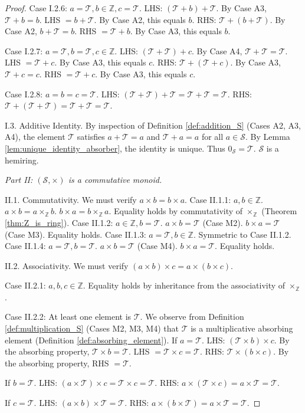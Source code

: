 \documentclass[11pt, a4paper]{article}
\theoremstyle{plain}
\theoremstyle{definition}
\numberwithin{equation}{section}
\newcommand{\Z}{\mathbb{Z}}
\newcommand{\Tobj}{\mathcal{T}} %
\newcommand{\SemiringS}{\mathcal{S}}
\begin{document}
\begin{proof}
Case I.2.6: $a=\Tobj, b \in \Z, c=\Tobj$.
LHS: $(\Tobj+b)+\Tobj$. By Case A3, $\Tobj+b=b$. LHS $= b+\Tobj$. By Case A2, this equals $b$.
RHS: $\Tobj+(b+\Tobj)$. By Case A2, $b+\Tobj=b$. RHS $= \Tobj+b$. By Case A3, this equals $b$.

Case I.2.7: $a=\Tobj, b=\Tobj, c \in \Z$.
LHS: $(\Tobj+\Tobj)+c$. By Case A4, $\Tobj+\Tobj=\Tobj$. LHS $= \Tobj+c$. By Case A3, this equals $c$.
RHS: $\Tobj+(\Tobj+c)$. By Case A3, $\Tobj+c=c$. RHS $= \Tobj+c$. By Case A3, this equals $c$.

Case I.2.8: $a=b=c=\Tobj$.
LHS: $(\Tobj+\Tobj)+\Tobj = \Tobj+\Tobj = \Tobj$. RHS: $\Tobj+(\Tobj+\Tobj) = \Tobj+\Tobj = \Tobj$.

I.3. Additive Identity. By inspection of Definition \ref{def:addition_S} (Cases A2, A3, A4), the element $\Tobj$ satisfies $a+\Tobj=a$ and $\Tobj+a=a$ for all $a \in \SemiringS$. By Lemma \ref{lem:unique_identity_absorber}, the identity is unique. Thus $0_{\SemiringS}=\Tobj$. $\SemiringS$ is a hemiring.

\emph{Part II: $(\SemiringS, \times)$ is a commutative monoid.}

II.1. Commutativity. We must verify $a\times b = b\times a$.
Case II.1.1: $a, b \in \Z$. $a\times b = a\times_{\Z} b$. $b\times a = b\times_{\Z} a$. Equality holds by commutativity of $\times_{\Z}$ (Theorem \ref{thm:Z_is_ring}).
Case II.1.2: $a \in \Z, b=\Tobj$. $a\times b = \Tobj$ (Case M2). $b\times a = \Tobj$ (Case M3). Equality holds.
Case II.1.3: $a=\Tobj, b \in \Z$. Symmetric to Case II.1.2.
Case II.1.4: $a=\Tobj, b=\Tobj$. $a\times b = \Tobj$ (Case M4). $b\times a = \Tobj$. Equality holds.

II.2. Associativity. We must verify $(a\times b)\times c = a\times(b\times c)$.

Case II.2.1: $a, b, c \in \Z$. Equality holds by inheritance from the associativity of $\times_{\Z}$.

Case II.2.2: At least one element is $\Tobj$. We observe from Definition \ref{def:multiplication_S} (Cases M2, M3, M4) that $\Tobj$ is a multiplicative absorbing element (Definition \ref{def:absorbing_element}).
If $a=\Tobj$. LHS: $(\Tobj\times b)\times c$. By the absorbing property, $\Tobj\times b = \Tobj$. LHS $=\Tobj\times c = \Tobj$.
RHS: $\Tobj\times(b\times c)$. By the absorbing property, RHS $=\Tobj$.

If $b=\Tobj$. LHS: $(a\times\Tobj)\times c = \Tobj\times c = \Tobj$.
RHS: $a\times(\Tobj\times c) = a\times\Tobj = \Tobj$.

If $c=\Tobj$. LHS: $(a\times b)\times\Tobj = \Tobj$.
RHS: $a\times(b\times\Tobj) = a\times\Tobj = \Tobj$.


\end{proof}
\end{document}
